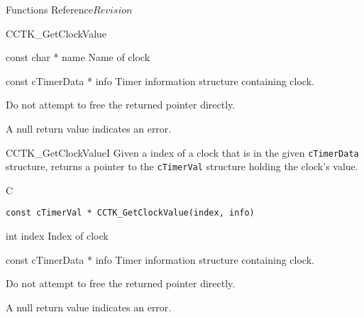 \begin{cactuspart}{ Functions Reference}{}{$Revision$}
\begin{FunctionDescription}{CCTK\_GetClockValue}
\begin{ParameterSection}
\begin{Parameter} {const char * name}
Name of clock
\end{Parameter}

\begin{Parameter} {const cTimerData * info}
Timer information structure containing clock.
\end{Parameter}
\end{ParameterSection}

\begin{Discussion}
Do not attempt to free the returned pointer directly.
\end{Discussion}
\begin{ErrorSection}
\begin{Error}
A null return value indicates an error.
\end{Error}
\end{ErrorSection}
\end{FunctionDescription}



\begin{FunctionDescription}{CCTK\_GetClockValueI}
\label{CCTK-GetClockValueI}
Given a index of a clock that is
in the given {\tt cTimerData} structure,
returns a pointer to the {\tt cTimerVal} structure holding the clock's value.
\begin{SynopsisSection}
\begin{Synopsis}{C}
\begin{verbatim}
const cTimerVal * CCTK_GetClockValue(index, info)
\end{verbatim}
\end{Synopsis}
\end{SynopsisSection}

\begin{ParameterSection}
\begin{Parameter} {int index}
Index of clock
\end{Parameter}

\begin{Parameter} {const cTimerData * info}
Timer information structure containing clock.
\end{Parameter}
\end{ParameterSection}

\begin{Discussion}
Do not attempt to free the returned pointer directly.
\end{Discussion}
\begin{ErrorSection}
\begin{Error}
A null return value indicates an error.
\end{Error}
\end{ErrorSection}
\end{FunctionDescription}



\end{cactuspart}
